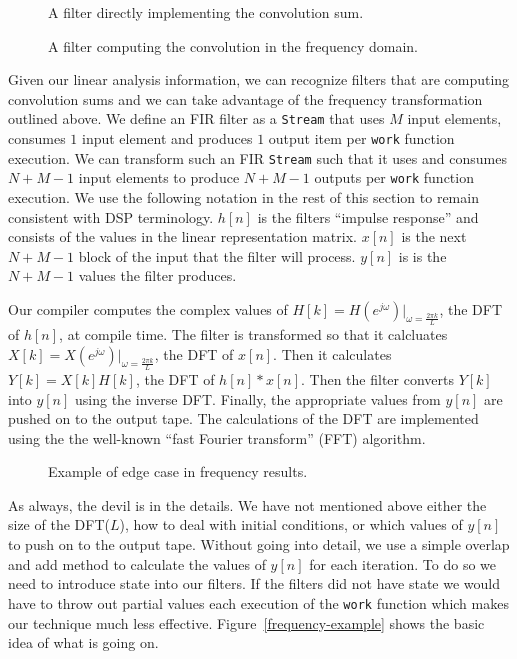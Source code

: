 \begin{figure}
\center
\epsfxsize=2.0in
\caption{A filter directly implementing the convolution sum.}
\label{fig:frequency-conversion-convolution}
\end{figure}

\begin{figure}
\center
\epsfxsize=2.0in
\caption{A filter computing the convolution in the frequency domain.}
\label{fig:frequency-conversion-frequency}
\end{figure}

Given our linear analysis information, we can recognize filters that are
computing convolution sums and we can take advantage of the frequency transformation 
outlined above. We define an FIR filter as a {\tt Stream} that uses $M$ input elements,
consumes $1$ input element and produces $1$ output item per {\tt work} function execution.
We can transform such an FIR {\tt Stream} such that it uses and consumes $N+M-1$ input
elements to produce $N+M-1$ outputs per {\tt work} function execution. We use the 
following notation in the rest of this section to remain consistent with DSP terminology.
$h[n]$ is the filters ``impulse response'' and consists of the values in the linear 
representation matrix. $x[n]$ is the next $N+M-1$ block of the input that the filter
will process. $y[n]$ is is the $N+M-1$ values the filter produces.

Our compiler computes the complex values of $H[k]=H(e^{j\omega})|_{\omega=\frac{2{\pi}k}{L}}$, 
the DFT of $h[n]$, at compile time. The filter is transformed 
so that it  calcluates $X[k]=X(e^{j\omega})|_{\omega=\frac{2{\pi}k}{L}}$, the DFT 
of $x[n]$. Then it calculates $Y[k]=X[k]H[k]$, the DFT of $h[n]*x[n]$.
Then the filter converts $Y[k]$ into $y[n]$ using the inverse DFT. Finally, 
the appropriate values from $y[n]$ are pushed on to the output tape. The
calculations of the DFT are implemented using the the well-known 
``fast Fourier transform'' (FFT) algorithm.

\begin{figure}
\center
\epsfxsize=3.0in
\caption{Example of edge case in frequency results.}
\label{fig:frequency-example}
\end{figure}

As always, the devil is in the details. We have not mentioned above either 
the size of the DFT($L$), how to deal with initial conditions, or which 
values of $y[n]$ to push on to the output tape. 
Without going into detail, we use a simple overlap and add\cite{oppenheim-discrete} 
method to calculate the values of $y[n]$ for each iteration. To do so 
we need to introduce state into our filters. If the filters did not have state
we would have to throw out partial values each execution of the {\tt work} function
which makes our technique much less effective. Figure~\ref{frequency-example} shows
the basic idea of what is going on.


